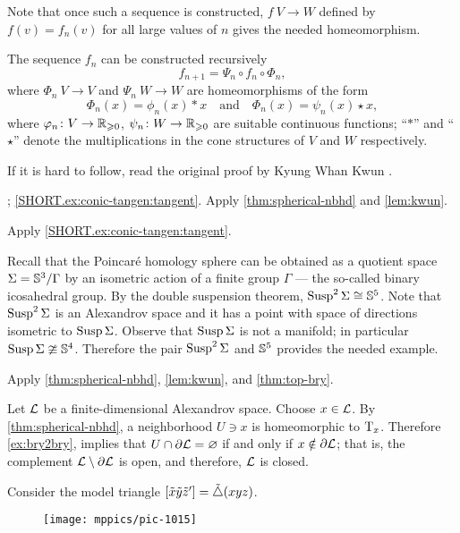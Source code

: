 Note that once such a sequence is constructed, $f\:V\to W$ defined by $f(v)=f_n(v)$ for all large values of $n$ gives the needed homeomorphism.

The sequence $f_n$ can be constructed recursively
\[f_{n+1}=\Psi_n\circ f_n\circ \Phi_n,\]
where $\Phi_n\:V\to V$ 
and $\Psi_n\:W\to W$ 
are homeomorphisms
of the form 
\[\Phi_n(x)=\phi_n(x)\ast x\quad \text{and}\quad \Phi_n(x)=\psi_n(x)\star x,\]
where $\varphi_n\colon V\to \mathbb{R}_{\geqslant 0}$, $\psi_n\colon W\to \mathbb{R}_{\geqslant 0}$ are suitable continuous functions;
``$\ast$'' and ``$\star$'' denote the multiplications in the cone structures of $V$ and $W$ respectively.

 If it is hard to follow, read the original proof by Kyung Whan Kwun \cite{kwun1964}.

\parbf{\ref{ex:conic-tangent}}; \ref{SHORT.ex:conic-tangen:tangent}. Apply \ref{thm:spherical-nbhd} and \ref{lem:kwun}.

 Apply \ref{SHORT.ex:conic-tangen:tangent}.

 Recall that the Poincaré homology sphere can be obtained as a quotient space $\Sigma=\mathbb{S}^3/\Gamma$ by an isometric action of a finite group $\Gamma$  --- the so-called binary icosahedral group.
By the double suspension theorem,  $\mathop{\rm Susp}\nolimits^2\Sigma\cong\mathbb{S}^5$.
Note that $\mathop{\rm Susp}\nolimits^2\Sigma$ is an Alexandrov space and it has a point with space of directions isometric to $\mathop{\rm Susp}\nolimits\Sigma$.
Observe that $\mathop{\rm Susp}\nolimits\Sigma$ is not a manifold; in particular $\mathop{\rm Susp}\nolimits\Sigma\ncong\mathbb{S}^4$.
Therefore the pair $\mathop{\rm Susp}\nolimits^2\Sigma$ and $\mathbb{S}^5$ provides the needed example.

 Apply \ref{thm:spherical-nbhd}, \ref{lem:kwun}, and \ref{thm:top-bry}.

Let $\mathcal{L}$ be a finite-dimensional Alexandrov space.
Choose $x\in\mathcal{L}$.
By \ref{thm:spherical-nbhd}, a neighborhood $U\ni x$ is homeomorphic to $\mathrm{T}_x$.
Therefore \ref{ex:bry2bry}, implies that $U\cap\partial\mathcal{L}=\varnothing$ if and only if $x\notin \partial\mathcal{L}$;
that is, the complement $\mathcal{L}\setminus\partial\mathcal{L}$ is open, and therefore, $\mathcal{L}$ is closed.

Consider the model triangle $[\tilde x\tilde y\tilde z']=\tilde\triangle(xyz)$.
\begin{figure}[ht!]
\vskip-0mm
\centering
\texttt{[image: mppics/pic-1015]}
\end{figure}

